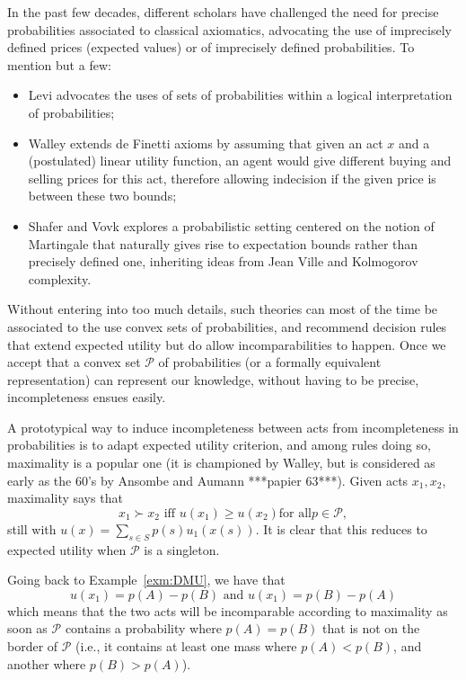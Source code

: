\documentclass[french, english]{llncs}
\begin{document}
	In the past few decades, different scholars have challenged the need for precise probabilities associated to classical axiomatics, advocating the use of imprecisely defined prices (expected values) or of imprecisely defined probabilities. To mention but a few:
	\begin{itemize} 
		\item Levi advocates the uses of sets of probabilities within a logical interpretation of probabilities;
		\item Walley extends de Finetti axioms by assuming that given an act $x$ and a (postulated) linear utility function, an agent would give different buying and selling prices for this act, therefore allowing indecision if the given price is between these two bounds;
		\item Shafer and Vovk explores a probabilistic setting centered on the notion of Martingale that naturally gives rise to expectation bounds rather than precisely defined one, inheriting ideas from Jean Ville and Kolmogorov complexity. 
	\end{itemize}
	Without entering into too much details, such theories can most of the time be associated to the use convex sets of probabilities, and recommend decision rules that extend expected utility but do allow incomparabilities to happen. Once we accept that a convex set $\mathcal{P}$ of probabilities (or a formally equivalent representation) can represent our knowledge, without having to be precise, incompleteness ensues easily. 
	
	A prototypical way to induce incompleteness between acts from incompleteness in probabilities is to adapt expected utility criterion, and among rules doing so, maximality is a popular one (it is championed by Walley, but is considered as early as the 60's by Ansombe and Aumann ***papier 63***). Given acts $x_1,x_2$, maximality says that 
	$$x_1 \succ x_2 \textrm{ iff }  u(x_1) ≥ u(x_2) \textrm{for all} p \in \mathcal{P},$$
	still with $u(x) = \sum_{s \in S} p(s) u_1(x(s))$. It is clear that this reduces to expected utility when $\mathcal{P}$	is a singleton. 
	
	\begin{example}
		Going back to Example~\ref{exm:DMU}, we have that 
		$$u(x_1)=p(A) - p(B) \textrm{ and } u(x_1)=p(B) - p(A)$$
		which means that the two acts will be incomparable according to maximality as soon as $\mathcal{P}$ contains a probability where $p(A)=p(B)$ that is not on the border of $\mathcal{P}$ (i.e., it contains at least one mass where $p(A)<p(B)$, and another where $p(B)>p(A)$). 
	\end{example}
	
\end{document}
